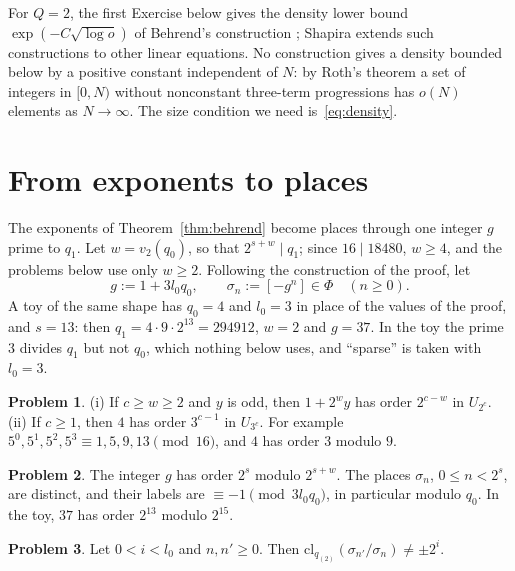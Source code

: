\documentclass[reqno]{amsart}
\theoremstyle{definition}
\newtheorem{problem}{Problem}[section]
\theoremstyle{plain}
\begin{document}
For \(Q = 2\), the first Exercise below gives the density lower bound \(\exp(-C\sqrt{\log o})\) of Behrend's construction \cite{Beh}; Shapira \cite{Sh} extends such constructions to other linear equations.  No construction gives a density bounded below by a positive constant independent of \(N\): by Roth's theorem \cite{Ro} a set of integers in \([0, N)\) without nonconstant three-term progressions has \(o(N)\) elements as \(N \to \infty\).  The size condition we need is~\eqref{eq:density}.

\section{From exponents to places}\label{sec:places}

The exponents of Theorem~\ref{thm:behrend} become places through one integer \(g\) prime to \(q_1\).  Let \(w = v_2(q_0)\), so that \(2^{s+w} \mid q_1\); since \(16 \mid 18480\), \(w \ge 4\), and the problems below use only \(w \ge 2\).  Following the construction of the proof, let
\[
  g := 1 + 3l_0q_0, \qquad \sigma_n := [-g^n] \in \Phi \quad (n \ge 0).
\]
A toy of the same shape has \(q_0 = 4\) and \(l_0 = 3\) in place of the values of the proof, and \(s = 13\): then \(q_1 = 4 \cdot 9 \cdot 2^{13} = 294912\), \(w = 2\) and \(g = 37\).  In the toy the prime \(3\) divides \(q_1\) but not \(q_0\), which nothing below uses, and ``sparse'' is taken with \(l_0 = 3\).

\begin{problem}\label{pr:cyclic}
(i) If \(c \ge w \ge 2\) and \(y\) is odd, then \(1 + 2^w y\) has order \(2^{c-w}\) in \(U_{2^c}\).  (ii) If \(c \ge 1\), then \(4\) has order \(3^{c-1}\) in \(U_{3^c}\).  For example \(5^0, 5^1, 5^2, 5^3 \equiv 1, 5, 9, 13 \pmod{16}\), and \(4\) has order \(3\) modulo \(9\).
\end{problem}

\begin{problem}\label{pr:long-order}
The integer \(g\) has order \(2^s\) modulo \(2^{s+w}\).  The places \(\sigma_n\), \(0 \le n < 2^s\), are distinct, and their labels are \(\equiv -1 \pmod{3l_0q_0}\), in particular modulo \(q_0\).  In the toy, \(37\) has order \(2^{13}\) modulo \(2^{15}\).
\end{problem}

\begin{problem}\label{pr:short-order}
Let \(0 < i < l_0\) and \(n, n' \ge 0\).  Then \(\mathrm{cl}_{q_{(2)}}(\sigma_{n'}/\sigma_n) \ne \pm 2^i\).
\end{problem}
\end{document}
